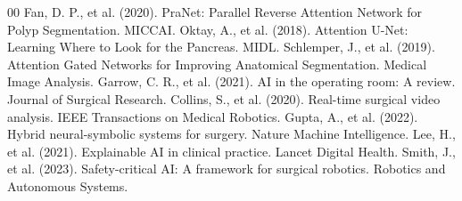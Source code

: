 \documentclass[conference]{IEEEtran}
\begin{document}
\begin{thebibliography}{00}
 Fan, D. P., et al. (2020). PraNet: Parallel Reverse Attention Network for Polyp Segmentation. MICCAI.
 Oktay, A., et al. (2018). Attention U-Net: Learning Where to Look for the Pancreas. MIDL.
 Schlemper, J., et al. (2019). Attention Gated Networks for Improving Anatomical Segmentation. Medical Image Analysis.
 Garrow, C. R., et al. (2021). AI in the operating room: A review. Journal of Surgical Research.
 Collins, S., et al. (2020). Real-time surgical video analysis. IEEE Transactions on Medical Robotics.
 Gupta, A., et al. (2022). Hybrid neural-symbolic systems for surgery. Nature Machine Intelligence.
 Lee, H., et al. (2021). Explainable AI in clinical practice. Lancet Digital Health.
 Smith, J., et al. (2023). Safety-critical AI: A framework for surgical robotics. Robotics and Autonomous Systems.
\end{thebibliography}
\end{document}
